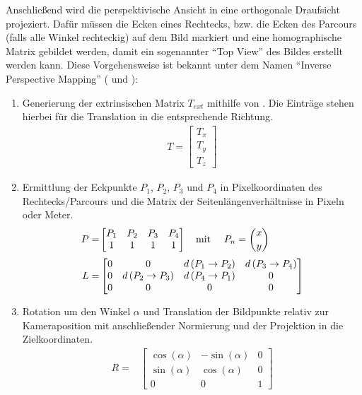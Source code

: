 Anschließend wird die perspektivische Ansicht in eine orthogonale Draufsicht projeziert. Dafür müssen die Ecken eines Rechtecks, bzw. die Ecken des Parcours (falls alle Winkel rechteckig) auf dem Bild markiert und eine homographische Matrix gebildet werden, damit ein sogenannter "`Top View"' des Bildes erstellt werden kann. Diese Vorgehensweise ist bekannt unter dem Namen "`Inverse Perspective Mapping"' (\cite{Galway} und \cite{Peter}): 
\begin{enumerate}
	\item Generierung der extrinsischen Matrix $T_{ext}$ mithilfe von \citep{Calib}. Die Einträge stehen hierbei für die Translation in die entsprechende Richtung.
	\begin{align*}
	T = \begin{bmatrix}
	T_x \\ 
	T_y \\ 
	T_z 
	\end{bmatrix}
	\end{align*}  
	\item Ermittlung der Eckpunkte $P_1$, $P_2$, $P_3$ und $P_4$ in Pixelkoordinaten des Rechtecks/Parcours und die Matrix der Seitenlängenverhältnisse in Pixeln oder Meter. 
	\begin{align*}
	P =& \begin{bmatrix}
	P_1 & P_2 & P_3 & P_4 \\
	1 & 1 & 1 & 1 	  
	\end{bmatrix} \text{\quad mit \quad} P_n = \binom{ x }{ y }\\[1mm]
	L =& \begin{bmatrix}
	0 & 0 & d\left(P_1 \rightarrow P_2 \right) & d\left(P_3 \rightarrow P_4 \right)\\
	0 & d\left(P_2 \rightarrow P_3 \right) & d\left(P_4 \rightarrow P_1 \right) & 0\\
	0 & 0 & 0 & 0 
	\end{bmatrix}	
	\end{align*}
	\item Rotation um den Winkel $\alpha$ und Translation der Bildpunkte relativ zur Kameraposition mit anschließender Normierung und der Projektion in die Zielkoordinaten. 
	\begin{align*}
	R =& \begin{bmatrix}
	\cos\left(\alpha \right) & -\sin\left(\alpha \right) & 0 \\
	\sin\left(\alpha \right) & \cos\left(\alpha \right) & 0 \\
	0 & 0 & 1 	  
	\end{bmatrix} \\[1mm]

\end{align*}
\end{enumerate}
